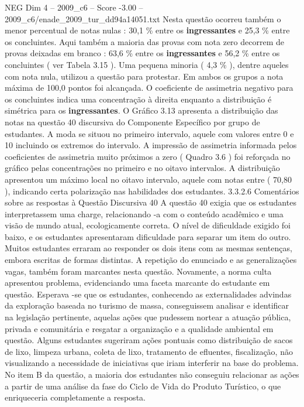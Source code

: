 \begin{textsample}{NEG Dim 4 – 2009\_c6 – Score -3.00 – 2009\_c6/enade\_2009\_tur\_dd94a14051.txt}
Nesta questão ocorreu também o menor percentual de notas nulas : 30,1 \% entre os \textbf{ingressantes} e 25,3 \% entre os concluintes.
Aqui também a maioria das provas com nota zero decorrem de provas deixadas em branco : 63,6 \% entre os \textbf{ingressantes} e 56,2 \% entre os concluintes ( ver Tabela 3.15 ).
Uma pequena minoria ( 4,3 \% ), dentre aqueles com nota nula, utilizou a questão para protestar.
Em ambos os grupos a nota máxima de 100,0 pontos foi alcançada.
O coeficiente de assimetria negativo para os concluintes indica uma concentração à direita enquanto a distribuição é simétrica para os \textbf{ingressantes}.
O Gráfico 3.13 apresenta a distribuição das notas na questão 40 discursiva do Componente Específico por grupo de estudantes.
A moda se situou no primeiro intervalo, aquele com valores entre 0 e 10 incluindo os extremos do intervalo.
A impressão de assimetria informada pelos coeficientes de assimetria muito próximos a zero ( Quadro 3.6 ) foi reforçada no gráfico pelas concentrações no primeiro e no oitavo intervalos.
A distribuição apresentou um máximo local no oitavo intervalo, aquele com notas entre ( 70,80 ), indicando certa polarização nas habilidades dos estudantes. 3.3.2.6 Comentários sobre as respostas à Questão Discursiva 40 A questão 40 exigia que os estudantes interpretassem uma charge, relacionando -a com o conteúdo acadêmico e uma visão de mundo atual, ecologicamente correta.
O nível de dificuldade exigido foi baixo, e os estudantes apresentaram dificuldade para separar um item do outro.
Muitos estudantes erraram ao responder os dois itens com as mesmas sentenças, embora escritas de formas distintas.
A repetição do enunciado e as generalizações vagas, também foram marcantes nesta questão.
Novamente, a norma culta apresentou problema, evidenciando uma faceta marcante do estudante em questão.
Esperava -se que os estudantes, conhecendo as externalidades advindas da exploração baseada no turismo de massa, conseguissem analisar e identificar na legislação pertinente, aquelas ações que pudessem nortear a atuação pública, privada e comunitária e resgatar a organização e a qualidade ambiental em questão.
Alguns estudantes sugeriram ações pontuais como distribuição de sacos de lixo, limpeza urbana, coleta de lixo, tratamento de efluentes, fiscalização, não visualizando a necessidade de iniciativas que iriam interferir na base do problema.
No item B da questão, a maioria dos estudantes não conseguiu relacionar as ações a partir de uma análise da fase do Ciclo de Vida do Produto Turístico, o que enriqueceria completamente a resposta.

\end{textsample}
